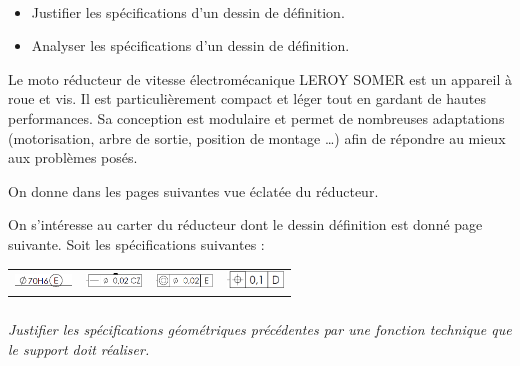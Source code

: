 \documentclass[10pt,fleqn]{article} %
\begin{document}

\vspace{7cm}
\pagestyle{fancy}
\thispagestyle{plain}


\def\columnseprulecolor{\color{ocre}}
\setlength{\columnseprule}{0.4pt} 

\begin{multicols}{2}

\begin{obj}~\\
\begin{itemize}
\item Justifier les spécifications d'un dessin de définition.
\item Analyser les spécifications d'un dessin de définition.
\end{itemize}
\end{obj}

Le moto réducteur de vitesse électromécanique LEROY SOMER  est un appareil à roue et vis. Il est particulièrement compact et léger tout en gardant de hautes performances.
Sa conception est modulaire et permet de nombreuses adaptations (motorisation, arbre de sortie, position de montage …) afin de répondre au mieux aux problèmes posés. 

On donne dans les pages suivantes vue éclatée du réducteur.


On s'intéresse au carter du réducteur dont le dessin définition est donné page suivante. 
Soit les spécifications suivantes : 
\begin{center}
\begin{tabular}{cccc}
\includegraphics[width=1.5cm]{images/reducteur_04_a} &
\includegraphics[width=1.5cm]{images/reducteur_04_b} &
\includegraphics[width=1.5cm]{images/reducteur_04_c} &
\includegraphics[width=1.5cm]{images/reducteur_04_d} \\
\end{tabular}
\end{center}

\subparagraph{}\textit{Justifier les spécifications géométriques précédentes par une fonction technique que le support doit réaliser. }


\end{multicols}
\end{document}
